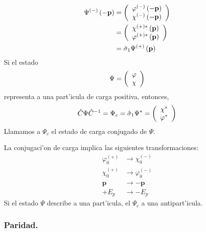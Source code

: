 \begin{align*}
\Psi^{\left(  -\right)  }\left(  -\mathbf{p}\right)   & =\left(
\begin{array}
[c]{c}%
\varphi^{\left(  -\right)  }\left(  -\mathbf{p}\right) \\
\chi^{\left(  -\right)  }\left(  -\mathbf{p}\right)
\end{array}
\right) \\
& =\left(
\begin{array}
[c]{c}%
\chi^{\left(  +\right)  \ast}\left(  \mathbf{p}\right) \\
\varphi^{\left(  +\right)  \ast}\left(  \mathbf{p}\right)
\end{array}
\right) \\
& =\hat{\sigma}_{1}\Psi^{\left(  +\right)  }\left(  \mathbf{p}\right)
\end{align*}
Si el estado
\begin{equation}
\Psi=\left(
\begin{array}
[c]{c}%
\varphi\\
\chi
\end{array}
\right)
\end{equation}
representa a una part'icula de carga positiva, entonces,
\begin{equation}
\hat{C}\Psi\hat{C}^{-1}=\Psi_{c}=\hat{\sigma}_{1}\Psi^{\ast}=\left(
\begin{array}
[c]{c}%
\chi^{\ast}\\
\varphi^{\ast}%
\end{array}
\right)
\end{equation}
Llamamos a $\Psi_{c}$ el estado de carga conjugado de $\Psi$.

La conjugaci'on de carga implica las siguientes transformaciones:
\begin{align*}
\varphi_{0}^{\left(  +\right)  }  & \rightarrow\chi_{0}^{\left(  -\right)  }\\
\chi_{0}^{\left(  +\right)  }  & \rightarrow\varphi_{0}^{\left(  -\right)  }\\
\mathbf{p}  & \rightarrow-\mathbf{p}\\
+E_{p}  & \rightarrow-E_{p}%
\end{align*}
Si el estado $\Psi$ describe a una part'icula, el $\Psi_{c}$ a una antipart'icula.

\subsubsection{Paridad.}

